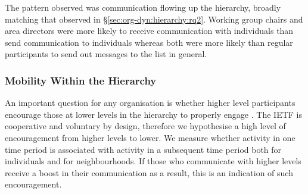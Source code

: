 \documentclass[twocolumn,10pt]{article}
\newcommand{\pb}[1]{\vspace{0.75ex}\noindent{\textbf{#1}}}
\begin{document}
\pb{Summary:}
The pattern observed was communication flowing up the hierarchy, broadly
matching that observed in \S\ref{sec:org-dyn:hierarchy:rq2}.  Working group
chairs and area directors were more likely to receive communication with
individuals than send communication to individuals whereas both were more
likely than regular participants to send out messages to the list in
general. 

\subsubsection{Mobility Within the Hierarchy}
\label{sec:org-dyn:hierarchy:rq4}



An important question for any organisation is whether higher level
participants encourage those at lower levels in the hierarchy to properly
engage \cite{li2021does,guo2020inclusive}. The IETF is cooperative and
voluntary by design, therefore we hypothesise a high level of encouragement
from higher levels to lower. We measure whether activity in one time period
is associated with activity in a subsequent time period both for
individuals and for neighbourhoods. If those who communicate with higher
levels receive a boost in their communication as a result, this is an
indication of such encouragement.



\end{document}
